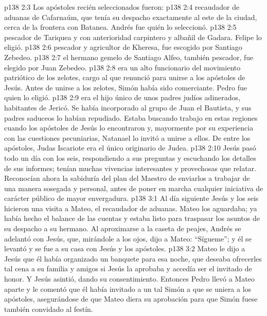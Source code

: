 \vs p138 2:3 Los apóstoles recién seleccionados fueron:
\vs p138 2:4  recaudador de aduanas de Cafarnaúm, que tenía su despacho exactamente al este de la ciudad, cerca de la frontera con Batanea. Andrés fue quién lo seleccionó.
\vs p138 2:5  pescador de Tariquea y con anterioridad carpintero y albañil de Gadara. Felipe lo eligió.
\vs p138 2:6  pescador y agricultor de Kheresa, fue escogido por Santiago Zebedeo.
\vs p138 2:7  el hermano gemelo de Santiago Alfeo, también pescador, fue elegido por Juan Zebedeo.
\vs p138 2:8  era un alto funcionario del movimiento patriótico de los zelotes, cargo al que renunció para unirse a los apóstoles de Jesús. Antes de unirse a los zelotes, Simón había sido comerciante. Pedro fue quien lo eligió.
\vs p138 2:9  era el hijo único de unos padres judíos adinerados, habitantes de Jericó. Se había incorporado al grupo de Juan el Bautista, y sus padres saduceos lo habían repudiado. Estaba buscando trabajo en estas regiones cuando los apóstoles de Jesús lo encontraron y, mayormente por su experiencia con las cuestiones pecuniarias, Natanael lo invitó a unirse a ellos. De entre los apóstoles, Judas Iscariote era el único originario de Judea.
\vs p138 2:10 \pc Jesús pasó todo un día con los seis, respondiendo a sus preguntas y escuchando los detalles de sus informes; tenían muchas vivencias interesantes y provechosas que relatar. Reconocían ahora la sabiduría del plan del Maestro de enviarlos a trabajar de una manera sosegada y personal, antes de poner en marcha cualquier iniciativa de carácter público de mayor envergadura.
\vs p138 3:1 Al día siguiente Jesús y los seis hicieron una visita a Mateo, el recaudador de aduanas. Mateo los aguardaba; ya había hecho el balance de las cuentas y estaba listo para traspasar los asuntos de su despacho a su hermano. Al aproximarse a la caseta de peajes, Andrés se adelantó con Jesús, que, mirándole a los ojos, dijo a Mateo: “Sígueme”; y él se levantó y se fue a su casa con Jesús y los apóstoles.
\vs p138 3:2 Mateo le dijo a Jesús que él había organizado un banquete para esa noche, que deseaba ofrecerles tal cena a su familia y amigos si Jesús la aprobaba y accedía ser el invitado de honor. Y Jesús asintió, dando su consentimiento. Entonces Pedro llevó a Mateo aparte y le comentó que él había invitado a un tal Simón a que se uniera a los apóstoles, asegurándose de que Mateo diera su aprobación para que Simón fuese también convidado al festín.
